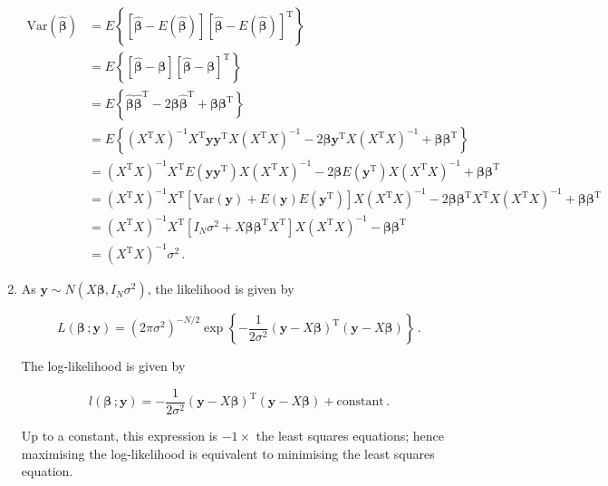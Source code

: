 \documentclass[
]{book}
\theoremstyle{definition}
\theoremstyle{definition}
\theoremstyle{definition}
\theoremstyle{definition}
\theoremstyle{remark}
\begin{document}
\begin{enumerate}
  \begin{align*}
  \mbox{Var}(\hat{\boldsymbol{\beta}}) & =E\left\{ \left[\hat{\boldsymbol{\beta}} - E(\hat{\boldsymbol{\beta}})\right] \left[\hat{\boldsymbol{\beta}} - E(\hat{\boldsymbol{\beta}})\right]^{\mathrm{T}} \right\}\\
   & =  E\left\{ \left[\hat{\boldsymbol{\beta}} - \boldsymbol{\beta}\right] \left[\hat{\boldsymbol{\beta}} - \boldsymbol{\beta}\right]^{\mathrm{T}} \right\}\\
   & = E\left\{ \hat{\boldsymbol{\beta}}\hat{\boldsymbol{\beta}}^{\mathrm{T}} - 2\boldsymbol{\beta}\hat{\boldsymbol{\beta}}^{\mathrm{T}} + \boldsymbol{\beta}\boldsymbol{\beta}^{\mathrm{T}} \right\}\\
   & = E\left\{ \left(X^{\mathrm{T}}X\right)^{-1}X^{\mathrm{T}}\boldsymbol{y}\boldsymbol{y}^{\mathrm{T}}X\left(X^{\mathrm{T}}X\right)^{-1}  - 2\boldsymbol{\beta}\boldsymbol{y}^{\mathrm{T}}X\left(X^{\mathrm{T}}X\right)^{-1} + \boldsymbol{\beta}\boldsymbol{\beta}^{\mathrm{T}}\right\}\\
   & = \left(X^{\mathrm{T}}X\right)^{-1}X^{\mathrm{T}}E(\boldsymbol{y}\boldsymbol{y}^{\mathrm{T}})X\left(X^{\mathrm{T}}X\right)^{-1} - 2\boldsymbol{\beta}E(\boldsymbol{y}^{\mathrm{T}})X\left(X^{\mathrm{T}}X\right)^{-1} + \boldsymbol{\beta}\boldsymbol{\beta}^{\mathrm{T}}\\
   & = \left(X^{\mathrm{T}}X\right)^{-1}X^{\mathrm{T}}\left[\mbox{Var}(\boldsymbol{y}) + E(\boldsymbol{y})E(\boldsymbol{y}^{\mathrm{T}})\right]X\left(X^{\mathrm{T}}X\right)^{-1} - 2\boldsymbol{\beta}\boldsymbol{\beta}^{\mathrm{T}}X^{\mathrm{T}}X\left(X^{\mathrm{T}}X\right)^{-1} + \boldsymbol{\beta}\boldsymbol{\beta}^{\mathrm{T}}\\
   & = \left(X^{\mathrm{T}}X\right)^{-1}X^{\mathrm{T}}\left[I_N\sigma^2 + X\boldsymbol{\beta}\boldsymbol{\beta}^{\mathrm{T}}X^{\mathrm{T}}\right]X\left(X^{\mathrm{T}}X\right)^{-1} - \boldsymbol{\beta}\boldsymbol{\beta}^{\mathrm{T}}\\
   & = \left(X^{\mathrm{T}}X\right)^{-1}\sigma^2\,. 
   \end{align*}
\item
  As \(\boldsymbol{y}\sim N\left(X\boldsymbol{\beta}, I_N\sigma^2\right)\), the likelihood is given by

  \[
   L(\boldsymbol{\beta}\,; \boldsymbol{y}) = \left(2\pi\sigma^2\right)^{-N/2}\exp\left\{-\frac{1}{2\sigma^2}(\boldsymbol{y}- X\boldsymbol{\beta})^{\mathrm{T}}(\boldsymbol{y}- X\boldsymbol{\beta})\right\}\,.
   \]

  The log-likelihood is given by

  \[
   l(\boldsymbol{\beta}\,;\boldsymbol{y}) = -\frac{1}{2\sigma^2}(\boldsymbol{y}- X\boldsymbol{\beta})^{\mathrm{T}}(\boldsymbol{y}- X\boldsymbol{\beta}) + \mbox{constant}\,.
   \]

  Up to a constant, this expression is \(-1\times\) the least squares equations; hence maximising the log-likelihood is equivalent to minimising the least squares equation.
\end{enumerate}
\end{document}
